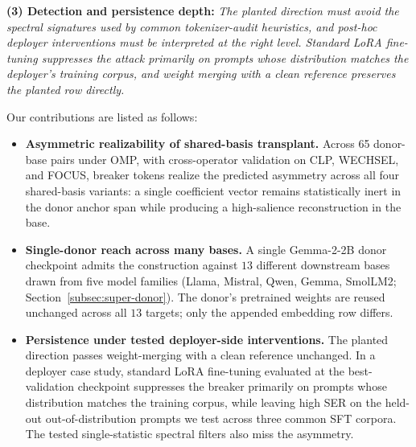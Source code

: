 \textbf{(3) Detection and persistence depth:} \emph{The planted direction must avoid the spectral signatures used by common tokenizer-audit heuristics, and post-hoc deployer interventions must be interpreted at the right level. Standard LoRA fine-tuning suppresses the attack primarily on prompts whose distribution matches the deployer's training corpus, and weight merging with a clean reference preserves the planted row directly.}







Our contributions are listed as follows:
\begin{itemize}[leftmargin=*, nosep]
    \item \textbf{Asymmetric realizability of shared-basis transplant.}
    Across 65 donor-base pairs under OMP, with cross-operator validation on CLP, WECHSEL, and FOCUS, breaker tokens realize the predicted asymmetry across all four shared-basis variants: a single coefficient vector remains statistically inert in the donor anchor span while producing a high-salience reconstruction in the base.

    \item \textbf{Single-donor reach across many bases.}
    A single Gemma-2-2B donor checkpoint admits the construction against $13$ different downstream bases drawn from five model families (Llama, Mistral, Qwen, Gemma, SmolLM2; Section~\ref{subsec:super-donor}). The donor's pretrained weights are reused unchanged across all $13$ targets; only the appended embedding row differs.

    \item \textbf{Persistence under tested deployer-side interventions.}
    The planted direction passes weight-merging with a clean reference unchanged. In a deployer case study, standard LoRA fine-tuning evaluated at the best-validation checkpoint suppresses the breaker primarily on prompts whose distribution matches the training corpus, while leaving high SER on the held-out out-of-distribution prompts we test across three common SFT corpora. The tested single-statistic spectral filters also miss the asymmetry.
\end{itemize}
